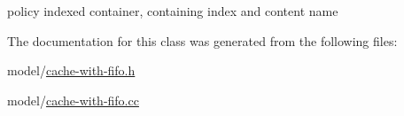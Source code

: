 policy indexed container, containing index and content name 



The documentation for this class was generated from the following files\-:\begin{DoxyCompactItemize}
\item 
model/\hyperlink{cache-with-fifo_8h}{cache-\/with-\/fifo.\-h}\item 
model/\hyperlink{cache-with-fifo_8cc}{cache-\/with-\/fifo.\-cc}\end{DoxyCompactItemize}
